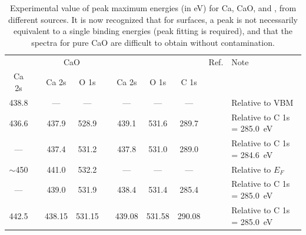 \documentclass[journal=jpccck,manuscript=article]{achemso}
\begin{document}
\begin{table}[!h]
	\caption{Experimental value of peak maximum energies  (in \si{\electronvolt}) for Ca, CaO, and  , from different sources. It is now recognized that for surfaces, a peak is not necessarily equivalent to a single binding energies (peak fitting is required), and that the spectra for pure CaO are difficult to obtain without contamination.\cite{dupinSystematicXPSStudies2000}}
		\begin{tabular}{c ccc c ccc cl}
			\toprule
			\ce{Ca^0} & & \multicolumn{2}{c}{CaO} & & \multicolumn{3}{c}{\ce{CaCO3}} & Ref. & Note\\
			\cline{1-1} \cline{3-4} \cline{6-8}
			Ca 2s & & Ca 2s & O 1s  & & Ca 2s & O 1s & C 1s\\
			\midrule
			438.8 & &---&---&& --- & --- &--- & \citenum{fuggleCorelevelBindingEnergies1980} & Relative to VBM\\
			436.6 & & 437.9 & 528.9& & 439.1 &531.6 & 289.7& \citenum{sosulnikovXrayPhotoelectronStudies1992}& Relative to C 1s = \SI{285.0}{\electronvolt}\\
			--- && 437.4 & 531.2&& 437.8 & 531.0 & 289.0 & \citenum{demriXPSStudyCalcium1995} & Relative to C 1s = \SI{284.6}{\electronvolt}\\
			$\sim$450 & & 441.0 & 532.2 & & --- & --- & --- & \citenum{ochsCO2ChemisorptionCa1998} & Relative to $E_F$ \\
			--- & & 439.0 & 531.9 & & 438.4 & 531.4 & 285.4 & \citenum{cristHandbookMonochromaticXPS2000a} & Relative to C 1s = \SI{285.0}{\electronvolt}\\
			442.5 & & 438.15 & 531.15 & & 439.08 & 531.58 & 290.08 & \citenum{cristXPSLibraryWebsite2021a} & Relative to C 1s = \SI{285.0}{\electronvolt}\\
			\bottomrule
		\end{tabular}
\end{table}
\end{document}
